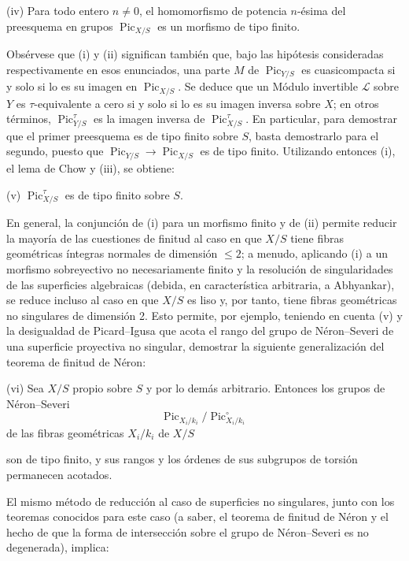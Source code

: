 \noindent(iv) Para todo entero $n\neq0$, el homomorfismo de potencia $n$-ésima
del preesquema en grupos $\operatorname{Pic}_{X/S}$ es un morfismo de tipo
finito.

Obsérvese que (i) y (ii) significan también que, bajo las hipótesis
consideradas respectivamente en esos enunciados, una parte $M$ de
$\operatorname{Pic}_{Y/S}$ es cuasicompacta si y solo si lo es su imagen en
$\operatorname{Pic}_{X/S}$. Se deduce que un Módulo invertible $\mathcal L$ sobre
$Y$ es $\tau$-equivalente a cero si y solo si lo es su imagen inversa sobre
$X$; en otros términos, $\operatorname{Pic}_{Y/S}^\tau$ es la imagen inversa
de $\operatorname{Pic}_{X/S}^\tau$. En particular, para demostrar que el
primer preesquema es de tipo finito sobre $S$, basta demostrarlo para el
segundo, puesto que $\operatorname{Pic}_{Y/S}\longrightarrow
\operatorname{Pic}_{X/S}$ es de tipo finito. Utilizando entonces (i), el lema
de Chow y (iii), se obtiene:

\medskip
\noindent(v) $\operatorname{Pic}_{X/S}^\tau$ es de tipo finito sobre $S$.

En general, la conjunción de (i) para un morfismo finito y de (ii) permite
reducir la mayoría de las cuestiones de finitud al caso en que $X/S$ tiene
fibras geométricas íntegras normales de dimensión $\leq2$; a menudo, aplicando
(i) a un morfismo sobreyectivo no necesariamente finito y la resolución de
singularidades de las superficies algebraicas (debida, en característica
arbitraria, a Abhyankar), se reduce incluso al caso en que $X/S$ es liso y,
por tanto, tiene fibras geométricas no singulares de dimensión 2. Esto permite,
por ejemplo, teniendo en cuenta (v) y la desigualdad de Picard--Igusa que
acota el rango del grupo de Néron--Severi de una superficie proyectiva no
singular, demostrar la siguiente generalización del teorema de finitud de
Néron:

\medskip
\noindent(vi) Sea $X/S$ propio sobre $S$ y por lo demás arbitrario. Entonces
los grupos de Néron--Severi
\[
\operatorname{Pic}_{X_i/k_i}/\operatorname{Pic}_{X_i/k_i}^\circ
\]
de las fibras geométricas $X_i/k_i$ de $X/S$

son de tipo finito, y sus rangos y los órdenes de sus subgrupos de torsión
permanecen acotados.

El mismo método de reducción al caso de superficies no singulares, junto con
los teoremas conocidos para este caso (a saber, el teorema de finitud de Néron
y el hecho de que la forma de intersección sobre el grupo de Néron--Severi es
no degenerada), implica:

